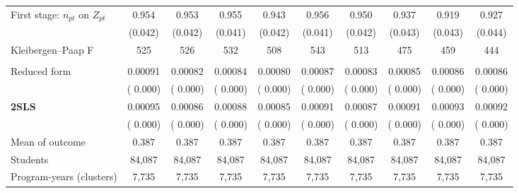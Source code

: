\begin{tabular}{l*{9}{c}}
First stage: \(n_{pt}\) on \(Z_{pt}\) &  0.954\sym{***} &  0.953\sym{***} &  0.955\sym{***} &  0.943\sym{***} &  0.956\sym{***} &  0.950\sym{***} &  0.937\sym{***} &  0.919\sym{***} &  0.927\sym{***} \\
 & (0.042) & (0.042) & (0.041) & (0.042) & (0.041) & (0.042) & (0.043) & (0.043) & (0.044) \\
Kleibergen--Paap F &    525 &    526 &    532 &    508 &    543 &    513 &    475 &    459 &    444 \\
\addlinespace
\multicolumn{10}{l}{Graduation from the enrolled program, 8y} \\
\quad Reduced form &  0.00091\sym{**} &  0.00082\sym{**} &  0.00084\sym{**} &  0.00080\sym{**} &  0.00087\sym{**} &  0.00083\sym{**} &  0.00085\sym{**} &  0.00086\sym{**} &  0.00086\sym{**} \\
 & ( 0.000) & ( 0.000) & ( 0.000) & ( 0.000) & ( 0.000) & ( 0.000) & ( 0.000) & ( 0.000) & ( 0.000) \\
\quad \textbf{2SLS} &  0.00095\sym{**} &  0.00086\sym{**} &  0.00088\sym{**} &  0.00085\sym{**} &  0.00091\sym{**} &  0.00087\sym{**} &  0.00091\sym{**} &  0.00093\sym{**} &  0.00092\sym{**} \\
 & ( 0.000) & ( 0.000) & ( 0.000) & ( 0.000) & ( 0.000) & ( 0.000) & ( 0.000) & ( 0.000) & ( 0.000) \\
Mean of outcome & 0.387 & 0.387 & 0.387 & 0.387 & 0.387 & 0.387 & 0.387 & 0.387 & 0.387 \\
Students &    84,087 &    84,087 &    84,087 &    84,087 &    84,087 &    84,087 &    84,087 &    84,087 &    84,087 \\
Program-years (clusters) &  7,735 &  7,735 &  7,735 &  7,735 &  7,735 &  7,735 &  7,735 &  7,735 &  7,735 \\
\bottomrule
\end{tabular}
